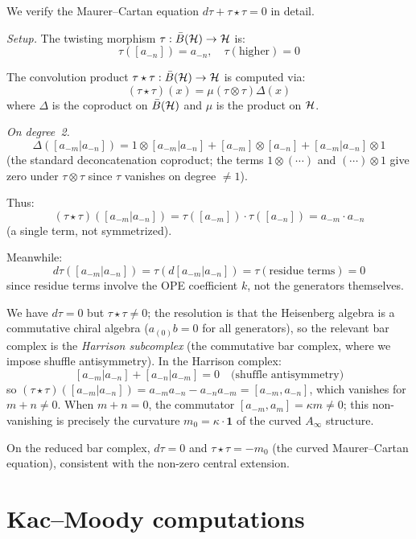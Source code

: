 \begin{computation}\label{comp:heisenberg-mc-deg4}
We verify the Maurer--Cartan equation $d\tau + \tau \star \tau = 0$ in detail.

\emph{Setup.} The twisting morphism $\tau: \bar{B}(\mathcal{H}) \to \mathcal{H}$ is:
\[
\tau([a_{-n}]) = a_{-n}, \quad \tau(\text{higher}) = 0
\]

The convolution product $\tau \star \tau: \bar{B}(\mathcal{H}) \to \mathcal{H}$ is computed via:
\[
(\tau \star \tau)(x) = \mu(\tau \otimes \tau)\Delta(x)
\]
where $\Delta$ is the coproduct on $\bar{B}(\mathcal{H})$ and $\mu$ is the product on $\mathcal{H}$.

\emph{On degree~2.}
\[
\Delta([a_{-m}|a_{-n}]) = 1 \otimes [a_{-m}|a_{-n}] + [a_{-m}] \otimes [a_{-n}] + [a_{-m}|a_{-n}] \otimes 1
\]
(the standard deconcatenation coproduct; the terms $1 \otimes (\cdots)$ and $(\cdots) \otimes 1$ give zero under $\tau \otimes \tau$ since $\tau$ vanishes on degree $\neq 1$).

Thus:
\[
(\tau \star \tau)([a_{-m}|a_{-n}]) = \tau([a_{-m}]) \cdot \tau([a_{-n}]) = a_{-m} \cdot a_{-n}
\]
(a single term, not symmetrized).

Meanwhile:
\[
d\tau([a_{-m}|a_{-n}]) = \tau(d[a_{-m}|a_{-n}]) = \tau(\text{residue terms}) = 0
\]
since residue terms involve the OPE coefficient $k$, not the generators themselves.

We have $d\tau = 0$ but $\tau \star \tau \neq 0$; the resolution is that the Heisenberg algebra is a commutative chiral algebra ($a_{(0)}b = 0$ for all generators), so the relevant bar complex is the \emph{Harrison subcomplex} (the commutative bar complex, where we impose shuffle antisymmetry).  In the Harrison complex:
\[
[a_{-m}|a_{-n}] + [a_{-n}|a_{-m}] = 0 \quad \text{(shuffle antisymmetry)}
\]
so $(\tau \star \tau)([a_{-m}|a_{-n}]) = a_{-m}a_{-n} - a_{-n}a_{-m} = [a_{-m}, a_{-n}]$,
which vanishes for $m + n \neq 0$.  When $m + n = 0$, the commutator
$[a_{-m}, a_m] = \kappa m \neq 0$; this non-vanishing is precisely the curvature
$m_0 = \kappa \cdot \mathbf{1}$ of the curved $A_\infty$ structure.

On the reduced bar complex, $d\tau = 0$ and
$\tau \star \tau = -m_0$ (the curved Maurer--Cartan equation), consistent with
the non-zero central extension.
\end{computation}


\section{Kac--Moody computations}
\label{sec:km-details}

